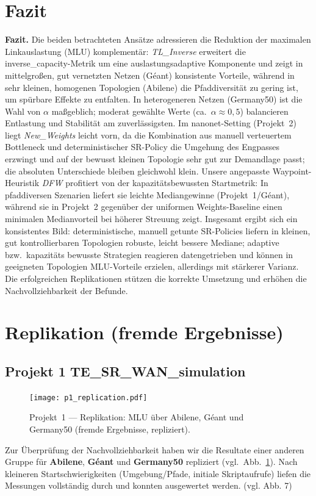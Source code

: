 \documentclass[sigconf,nonacm,review]{acmart}
\begin{document}
\FloatBarrier
\section{Fazit}
\textbf{Fazit.}
Die beiden betrachteten Ansätze adressieren die Reduktion der maximalen Linkauslastung (MLU) komplementär:
\emph{TL\_Inverse} erweitert die inverse\_capacity-Metrik um eine auslastungsadaptive Komponente und zeigt in
mittelgroßen, gut vernetzten Netzen (Géant) konsistente Vorteile, während in sehr kleinen, homogenen Topologien
(Abilene) die Pfaddiversität zu gering ist, um spürbare Effekte zu entfalten. In heterogeneren Netzen (Germany50)
ist die Wahl von $\alpha$ maßgeblich; moderat gewählte Werte (ca.\ $\alpha\!\approx\!0{,}5$) balancieren Entlastung
und Stabilität am zuverlässigsten. Im nanonet-Setting (Projekt~2) liegt \emph{New\_Weights} leicht vorn,
da die Kombination aus manuell verteuertem Bottleneck und deterministischer SR-Policy die Umgehung des Engpasses
erzwingt und auf der bewusst kleinen Topologie sehr gut zur Demandlage passt; die absoluten Unterschiede bleiben
gleichwohl klein. Unsere angepasste Waypoint-Heuristik \emph{DFW} profitiert von der
kapazitätsbewussten Startmetrik: In pfaddiversen Szenarien liefert sie leichte Mediangewinne (Projekt~1/Géant),
während sie in Projekt~2 gegenüber der uniformen Weights-Baseline einen minimalen Medianvorteil bei höherer
Streuung zeigt. Insgesamt ergibt sich ein konsistentes Bild: deterministische, manuell getunte SR-Policies
liefern in kleinen, gut kontrollierbaren Topologien robuste, leicht bessere Mediane; adaptive bzw.\ kapazitäts­
bewusste Strategien reagieren datengetrieben und können in geeigneten Topologien MLU-Vorteile erzielen, allerdings
mit stärkerer Varianz. Die erfolgreichen Replikationen stützen die korrekte Umsetzung und erhöhen die Nachvollziehbarkeit
der Befunde.

\clearpage
\section{Replikation (fremde Ergebnisse)}

\subsection{Projekt 1\,\textemdash\,TE\_SR\_WAN\_simulation}
\begin{figure}[H]
  \centering
  \texttt{[image: p1\_replication.pdf]}
  \caption{Projekt~1 — Replikation: MLU über Abilene, Géant und Germany50 (fremde Ergebnisse, repliziert).}
  \label{fig:p1-repl}
\end{figure}
\noindent
Zur Überprüfung der Nachvollziehbarkeit haben wir die Resultate einer anderen Gruppe für
\textbf{Abilene}, \textbf{Géant} und \textbf{Germany50} repliziert (vgl.\ Abb.~\ref{fig:p1-repl}).
Nach kleineren Startschwierigkeiten (Umgebung/Pfade, initiale Skriptaufrufe) liefen die
Messungen vollständig durch und konnten ausgewertet werden. (vgl. Abb. 7)
\end{document}
